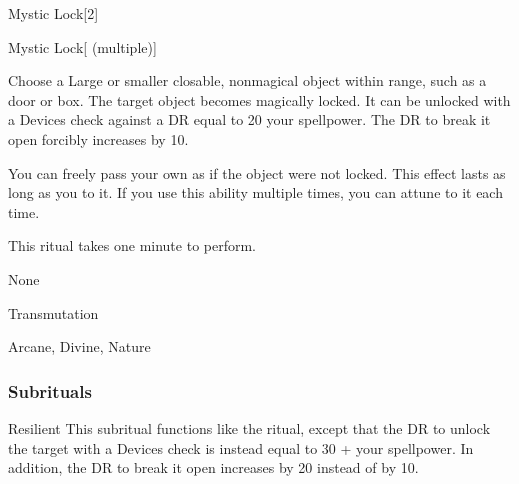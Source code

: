 \begin{spellsection}{Mystic Lock}[2]


\begin{ability}{Mystic Lock}[ (multiple)]

Choose a Large or smaller closable, nonmagical object within \rngclose range, such as a door or box.
The target object becomes magically locked.
It can be unlocked with a Devices check against a DR equal to 20 \add your spellpower.
The DR to break it open forcibly increases by 10.

You can freely pass your own  as if the object were not locked.
This effect lasts as long as you  to it.
If you use this ability multiple times, you can attune to it each time.

This ritual takes one minute to perform.

\end{ability}


 None

 Transmutation

 Arcane, Divine, Nature
\end{spellsection}


\subsubsection{Subrituals}


\begin{ability}[\nth{5}]{Resilient}
This subritual functions like the  ritual, except that the DR to unlock the target with a Devices check is instead equal to 30 + your spellpower.
In addition, the DR to break it open increases by 20 instead of by 10.
\end{ability}
\vspace{0.25em}


